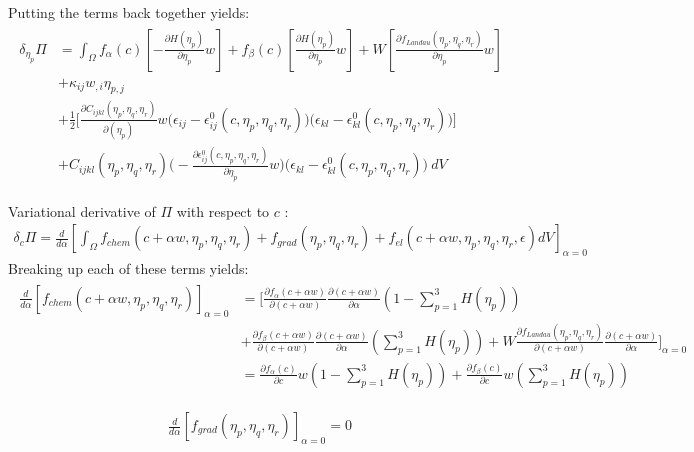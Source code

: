 \documentclass[11pt]{article}
\renewcommand{\=}[1]{\stackrel{#1}{=}} %
\theoremstyle{definition}
\theoremstyle{remark}
\begin{document}
Putting the terms back together yields:
\begin{gather}
\begin{split}
\delta_{\eta_p} \Pi  &=  \int_{\Omega}  f_{\alpha}(c) \left[  -\frac{\partial H(\eta_p)}{\partial \eta_p} w \right] +f_{\beta}(c) \left[  \frac{\partial H(\eta_p)}{\partial \eta_p } w \right] 
+ W \left[\frac{\partial f_{Landau}(\eta_p,\eta_q,\eta_r)}{\partial \eta_p} w \right] \\
&+ \kappa_{ij} w_{,i} \eta_{p,j} \\
&+\frac{1}{2}  \bigg[  \frac{\partial C_{ijkl}(\eta_p,\eta_q,\eta_r)}{\partial (\eta_p)} w \big(\epsilon_{ij}-\epsilon_{ij}^0 (c,\eta_p,\eta_q,\eta_r) \big) \big(\epsilon_{kl}-\epsilon_{kl}^0 (c,\eta_p,\eta_q,\eta_r) \big) \bigg] \\
&+ C_{ijkl}(\eta_p,\eta_q,\eta_r) \bigg (-\frac{\partial\epsilon_{ij}^0 (c,\eta_p,\eta_q,\eta_r)}{\partial \eta_p} w \bigg) \big(\epsilon_{kl}-\epsilon_{kl}^0 (c,\eta_p,\eta_q,\eta_r)\big)  ~dV  
\end{split}
\end{gather}

Variational derivative of $\Pi$ with respect to $c$ :
\begin{gather}
\delta_{c} \Pi  =  \frac{d}{d\alpha} \left[\int_{\Omega}  f_{chem}(c+\alpha w,\eta_p,\eta_q,\eta_r) + f_{grad}(\eta_p,\eta_q,\eta_r) + f_{el}(c+\alpha w,\eta_p,\eta_q,\eta_r,\epsilon) dV  \right]_{\alpha=0}
\end{gather}
Breaking up each of these terms yields:
\begin{align}
\begin{split}
\frac{d}{d\alpha} \left[ f_{chem}(c+\alpha w,\eta_p,\eta_q,\eta_r)\right]_{\alpha=0}  &= \bigg[ \frac{\partial f_{\alpha}(c + \alpha w)}{\partial(c+\alpha w)} \frac{\partial(c+\alpha w)}{\partial \alpha} \left(1-\sum_{p=1}^3 H(\eta_p)\right) \\
&+ \frac{\partial f_{\beta}(c+\alpha w)}{\partial(c+\alpha w)} \frac{\partial(c+\alpha w)}{\partial \alpha} \left(\sum_{p=1}^3 H(\eta_p)\right) + W \frac{\partial f_{Landau}(\eta_p,\eta_q,\eta_r)}{\partial(c+\alpha w)} \frac{\partial(c+\alpha w)}{\partial \alpha} \bigg]_{\alpha=0}
\\
&= \frac{\partial f_{\alpha}(c)}{\partial c} w \left(1-\sum_{p=1}^3 H(\eta_p)\right) +\frac{\partial f_{\beta}(c)}{\partial c} w \left(\sum_{p=1}^3 H(\eta_p)\right)
\end{split}
\end{align}

\begin{align}
\frac{d}{d\alpha} \left[ f_{grad}(\eta_p,\eta_q,\eta_r)\right]_{\alpha=0} = 0
\end{align}
\end{document}
